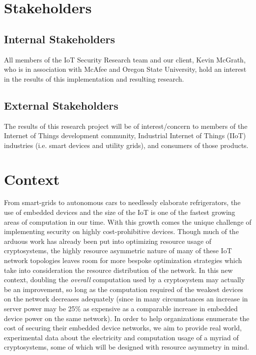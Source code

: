 \documentclass[tikz,a4paper,titlepage]{article}
\begin{document}
\section{Stakeholders}

\subsection{Internal Stakeholders}

All members of the IoT Security Research team and our client, Kevin McGrath, who is in association with McAfee and Oregon State University, hold an interest in the results of this implementation and resulting research.

\subsection{External Stakeholders}

The results of this research project will be of interest/concern to members of the Internet of Things development community, Industrial Internet of Things (IIoT) industries (i.e. smart devices and utility grids), and consumers of those products. 


%
%

\section{Context}

From smart-grids to autonomous cars to needlessly elaborate refrigerators, the use of embedded devices and the size of the IoT is one of the fastest growing areas of computation in our time. With this growth comes the unique challenge of implementing security on highly cost-prohibitive devices. Though much of the arduous work has already been put into optimizing resource usage of cryptosystems, the highly resource asymmetric nature of many of these IoT network topologies leaves room for more bespoke optimization strategies which take into consideration the resource distribution of the network. In this new context, doubling the \textit{overall} computation used by a cryptosystem may actually be an improvement, so long as the computation required of the weakest devices on the network decreases adequately (since in many circumstances an increase in server power may be 25\% as expensive as a comparable increase in embedded device power on the same network). In order to help organizations enumerate the cost of securing their embedded device networks, we aim to provide real world, experimental data about the electricity and computation usage of a myriad of cryptosystems, some of which will be designed with resource asymmetry in mind. 
\end{document}
